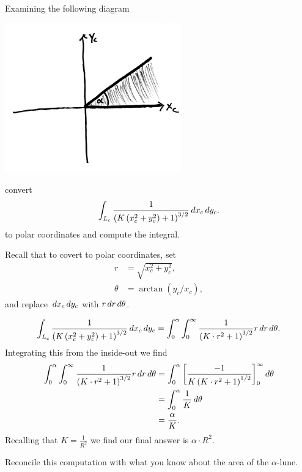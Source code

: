 \documentclass{ximera}
\begin{document}
\begin{problem}
  Examining the following diagram
  \begin{image}
    \includegraphics[width=3in]{halfLune.png}
  \end{image}
  convert
  \[
  \int_{L_c} \frac{1}{\left(K\left(x_c^2+y_c^2\right)+1\right)^{3/2}} \,d x_c\,d y_c.
  \]
  to polar coordinates and compute the integral.
  \begin{hint}
    Recall that to covert to polar coordinates, set
    \begin{align*}
      r &= \sqrt{x_c^2+y_c^2},\\
      \theta &= \arctan(y_c/x_c),
    \end{align*}
    and replace $\,d x_c\,d y_c$ with $r\,d r\,d \theta$.
  \end{hint}
  \begin{freeResponse}
    \[
    \int_{L_c}
    \frac{1}{\left(K\left(x_c^2+y_c^2\right)+1\right)^{3/2}} \,d x_c\,d
    y_c = \int_0^\alpha \int_0^\infty \frac{1}{\left(K\cdot r^2+1\right)^{3/2}} r\,d r \,d \theta.
    \]
    Integrating this from the inside-out we find
    \begin{align*}
      \int_0^\alpha \int_0^\infty \frac{1}{\left(K\cdot r^2+1\right)^{3/2}} r\,d r \,d \theta &= \int_0^\alpha \bigg[ \frac{-1}{K\left(K\cdot r^2+1\right)^{1/2}} \bigg]_0^\infty \,d \theta\\
      &= \int_0^\alpha \frac{1}{K} \,d \theta\\
      &= \frac{\alpha}{K}.   
    \end{align*}
    Recalling that $K = \frac{1}{R^2}$ we find our final answer is $\alpha \cdot R^2$.
  \end{freeResponse}
\end{problem}

\begin{problem}
  Reconcile this computation with what you know about the area of the
  $\alpha$-lune.
\end{problem}
\end{document}
